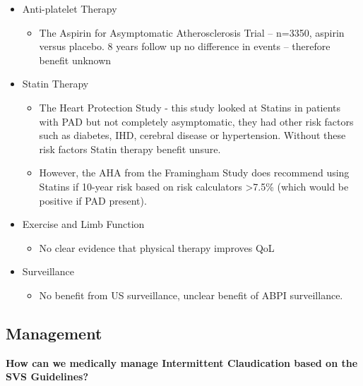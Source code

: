 \documentclass[
]{book}
\providecommand{\tightlist}{%
  \setlength{\itemsep}{0pt}\setlength{\parskip}{0pt}}
\begin{document}
\begin{itemize}
\item
  Anti-platelet Therapy

  \begin{itemize}
  \tightlist
  \item
    The Aspirin for Asymptomatic Atherosclerosis Trial -- n=3350,
    aspirin versus placebo. 8 years follow up no difference in
    events \citep{fowkesAspirinPreventionCardiovascular2010} -- therefore
    benefit unknown
  \end{itemize}
\item
  Statin Therapy

  \begin{itemize}
  \item
    The Heart Protection Study
    \citep{heartprotectionstudycollaborativegroupRandomizedTrialEffects2007} -
    this study looked at Statins in patients with PAD but not
    completely asymptomatic, they had other risk factors such as
    diabetes, IHD, cerebral disease or hypertension. Without these
    risk factors Statin therapy benefit unsure.
  \item
    However, the AHA from the Framingham Study does recommend using
    Statins if 10-year risk based on risk calculators \textgreater7.5\% (which
    would be positive if PAD present).
  \end{itemize}
\item
  Exercise and Limb Function

  \begin{itemize}
  \tightlist
  \item
    No clear evidence that physical therapy improves QoL
  \end{itemize}
\item
  Surveillance

  \begin{itemize}
  \tightlist
  \item
    No benefit from US surveillance, unclear benefit of ABPI
    surveillance.
  \end{itemize}
\end{itemize}

\hypertarget{management-2}{%
\subsection{Management}\label{management-2}}

\textbf{How can we medically manage Intermittent Claudication based on the SVS
Guidelines?}
\end{document}
